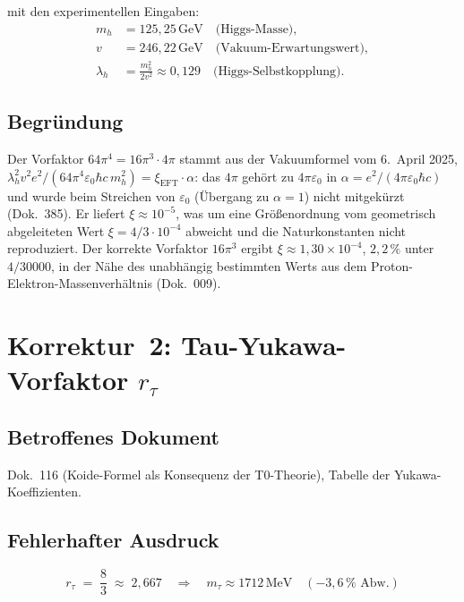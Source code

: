 mit den experimentellen Eingaben:
\begin{align*}
  m_h      &= 125{,}25\,\text{GeV} \quad \text{(Higgs-Masse)}, \\
  v        &= 246{,}22\,\text{GeV} \quad \text{(Vakuum-Erwartungswert)}, \\
  \lambda_h &= \frac{m_h^2}{2v^2} \approx 0{,}129
               \quad \text{(Higgs-Selbstkopplung)}.
\end{align*}

\subsection*{Begründung}

Der Vorfaktor $64\pi^4 = 16\pi^3 \cdot 4\pi$ stammt aus der Vakuumformel
vom 6.~April 2025,
$\lambda_h^2 v^2 e^2/(64\pi^4 \varepsilon_0 \hbar c\, m_h^2) = \xi_{\text{EFT}} \cdot \alpha$:
das $4\pi$ gehört zu $4\pi\varepsilon_0$ in $\alpha = e^2/(4\pi\varepsilon_0\hbar c)$ und wurde
beim Streichen von $\varepsilon_0$ (Übergang zu $\alpha = 1$) nicht mitgekürzt (Dok.~385).
Er liefert $\xi \approx 10^{-5}$, was um eine
Größenordnung vom geometrisch abgeleiteten Wert
$\xi = 4/3 \cdot 10^{-4}$ abweicht und die Naturkonstanten nicht
reproduziert. Der korrekte Vorfaktor $16\pi^3$ ergibt
$\xi \approx 1{,}30 \times 10^{-4}$, $2{,}2\,\%$ unter $4/30000$, in der Nähe des unabhängig
bestimmten Werts aus dem Proton-Elektron-Massenverhältnis (Dok.~009).

\section{Korrektur~2: Tau-Yukawa-Vorfaktor $r_\tau$}

\subsection*{Betroffenes Dokument}

Dok.~116 (Koide-Formel als Konsequenz der T0-Theorie), Tabelle der
Yukawa-Koeffizienten.

\subsection*{Fehlerhafter Ausdruck}

\begin{equation}
  r_\tau \;=\; \frac{8}{3} \;\approx\; 2{,}667
  \quad \Rightarrow \quad
  m_\tau \approx 1712\,\text{MeV} \quad (-3{,}6\,\% \text{ Abw.})
  \tag{alt -- falsch}
\end{equation}

